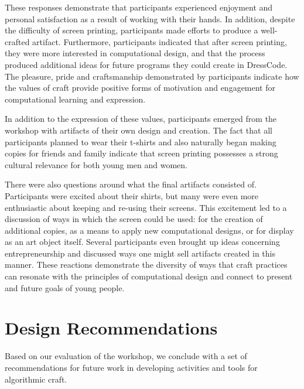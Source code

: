 \documentclass{sigchi}
\begin{document}
These responses demonstrate that participants experienced enjoyment and personal satisfaction as a result of working with their hands. In addition, despite the difficulty of screen printing, participants made efforts to produce a well-crafted artifact. Furthermore, participants indicated that after screen printing, they were more interested in computational design, and that the process produced additional ideas for future programs they could create in DressCode. The pleasure, pride and craftsmanship demonstrated by participants indicate how the values of craft provide positive forms of motivation and engagement for computational learning and expression. 

In addition to the expression of these values, participants emerged from the workshop with artifacts of their own design and creation. The fact that all participants planned to wear their t-shirts and also naturally began making copies for friends and family indicate that screen printing possesses a strong cultural relevance for both young men and women. %

There were also questions around what the final artifacts consisted of. Participants were excited about their shirts, but many were even more enthusiastic about keeping and re-using their screens. This excitement led to a discussion of ways in which the screen could be used: for the creation of additional copies, as a means to apply new computational designs, or for display as an art object itself. Several participants even brought up ideas concerning entrepreneurship and discussed ways one might sell artifacts created in this manner. These reactions demonstrate the diversity of ways that craft practices can resonate with the principles of computational design and connect to present and future goals of young people.

\section{Design Recommendations}
Based on our evaluation of the workshop, we conclude with a set of recommendations for future work in developing activities and tools for algorithmic craft. 
\end{document}
